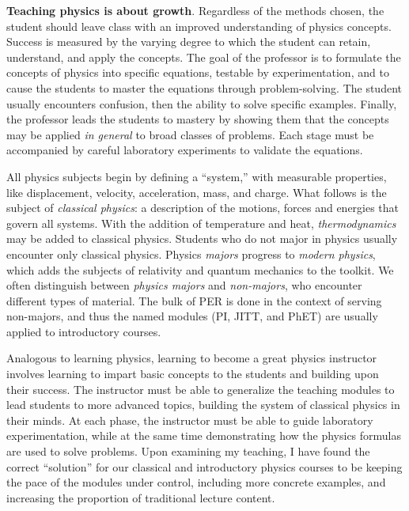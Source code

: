 \documentclass[../../main.tex]{subfiles}
\begin{document}
\textbf{Teaching physics is about growth}.  Regardless of the methods chosen, the student should leave class with an improved understanding of physics concepts.  Success is measured by the varying degree to which the student can retain, understand, and apply the concepts.  The goal of the professor is to formulate the concepts of physics into specific equations, testable by experimentation, and to cause the students to master the equations through problem-solving.  The student usually encounters confusion, then the ability to solve specific examples.  Finally, the professor leads the students to mastery by showing them that the concepts may be applied \textit{in general} to broad classes of problems. Each stage must be accompanied by careful laboratory experiments to validate the equations. \\ \hspace{0.1cm}

All physics subjects begin by defining a ``system,'' with measurable properties, like displacement, velocity, acceleration, mass, and charge.  What follows is the subject of \textit{classical physics}: a description of the motions, forces and energies that govern all systems.  With the addition of temperature and heat, \textit{thermodynamics} may be added to classical physics.  Students who do not major in physics usually encounter only classical physics.  Physics \textit{majors} progress to \textit{modern physics}, which adds the subjects of relativity and quantum mechanics to the toolkit.  We often distinguish between \textit{physics majors} and \textit{non-majors}, who encounter different types of material.  The bulk of PER is done in the context of serving non-majors, and thus the named modules (PI, JITT, and PhET) are usually applied to introductory courses.  \\ \hspace{0.1cm}

Analogous to learning physics, learning to become a great physics instructor involves learning to impart basic concepts to the students and building upon their success.  The instructor must be able to generalize the teaching modules to lead students to more advanced topics, building the system of classical physics in their minds.  At each phase, the instructor must be able to guide laboratory experimentation, while at the same time demonstrating how the physics formulas are used to solve problems.  Upon examining my teaching, I have found the correct ``solution'' for our classical and introductory physics courses to be keeping the pace of the modules under control, including more concrete examples, and increasing the proportion of traditional lecture content.  \\ \hspace{0.1cm}
\end{document}
